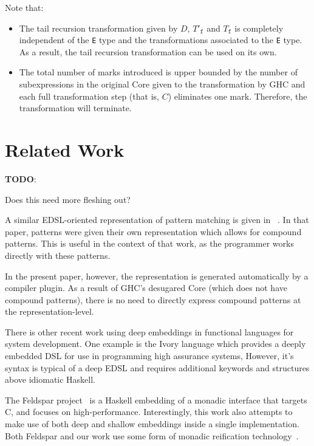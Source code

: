 \documentclass[sigplan,anonymous,review]{acmart}
\newcommand{\ttt}{\texttt}
\newenvironment{todo}
  {\begin{tcolorbox}
   \textbf{TODO}:
  }
  {\end{tcolorbox}
  }
\begin{document}
\clearpage

Note that:
\begin{itemize}
  \item The tail recursion transformation given by $D$, $T'_{\ttt{f}}$ and $T_{\ttt{f}}$ is completely independent of the \ttt{E} type and the transformations associated to the \ttt{E} type. As a result, the tail recursion transformation can be used on its own.

  \item The total number of marks introduced is upper bounded by the number of
subexpressions in the original Core given to the transformation by GHC and each
full transformation step (that is, $C$) eliminates one mark. Therefore, the
transformation will terminate.
\end{itemize}

\clearpage
\section{Related Work}
\begin{todo}
  Does this need more fleshing out?
\end{todo}

A similar EDSL-oriented representation of pattern matching is given in
~\cite[Section~3.3]{Atkey:09:Unembedding}. In that paper, patterns were given their own
representation which allows for compound patterns. This is useful in the context
of that work, as the programmer works directly with these patterns.

In the present paper, however, the representation is generated automatically by
a compiler plugin. As a result of GHC's desugared Core (which does not have
compound patterns), there is no need to directly express compound patterns at
the representation-level.

There is other recent work using deep embeddings in functional languages for 
system development.  One example is the Ivory language \cite{Elliott2015-Ivory} 
which provides a deeply embedded DSL for use in programming high assurance
systems,  However, it's syntax is typical of a deep EDSL and requires additional 
keywords and structures above idiomatic Haskell.

The Feldspar project~\cite{Axelsson:10:Feldspar,Axelsson,Svenningsson:13:Combining}
is a Haskell embedding of a monadic interface
that targets C, and focuses on high-performance. Interestingly, this work
also attempts to make use of both deep and shallow embeddings inside a single
implementation. Both Feldspar and our work use some form
of monadic reification technology~\cite{Persson:11:MonadicDSL,Svenningsson:13:Compositional,Sculthorpe:13:ConstrainedMonad}.
\end{document}
